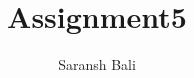 \documentclass[journal,12pt,twocolumn]{IEEEtran}
\begin{document}
\makeatletter
{}
\makeatother
\let\StandardTheFigure\thefigure
\let\vec\mathbf
\renewcommand{\thefigure}{\theproblem}
\def\putbox#1#2#3{\makebox[0in][l]{\makebox[#1][l]{}\raisebox{\baselineskip}[0in][0in]{\raisebox{#2}[0in][0in]{#3}}}}
     \def\rightbox#1{\makebox[0in][r]{#1}}
     \def\centbox#1{\makebox[0in]{#1}}
     \def\topbox#1{\raisebox{-\baselineskip}[0in][0in]{#1}}
     \def\midbox#1{\raisebox{-0.5\baselineskip}[0in][0in]{#1}}
\vspace{3cm}
\title{Assignment5}
\author{Saransh Bali}
%
%
%
% 
%
\end{document}
